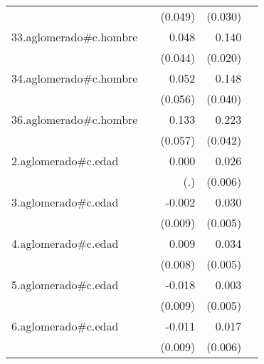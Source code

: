 {\begin{longtable}{l*{4}{D{.}{.}{-1}}}
            &                     &     (0.049)         &     (0.030)         &                     \\
\addlinespace
33.aglomerado#c.hombre&                     &       0.048         &       0.140\sym{***}&                     \\
            &                     &     (0.044)         &     (0.020)         &                     \\
\addlinespace
34.aglomerado#c.hombre&                     &       0.052         &       0.148\sym{***}&                     \\
            &                     &     (0.056)         &     (0.040)         &                     \\
\addlinespace
36.aglomerado#c.hombre&                     &       0.133\sym{*}  &       0.223\sym{***}&                     \\
            &                     &     (0.057)         &     (0.042)         &                     \\
\addlinespace
2.aglomerado#c.edad&                     &       0.000         &       0.026\sym{***}&                     \\
            &                     &         (.)         &     (0.006)         &                     \\
\addlinespace
3.aglomerado#c.edad&                     &      -0.002         &       0.030\sym{***}&                     \\
            &                     &     (0.009)         &     (0.005)         &                     \\
\addlinespace
4.aglomerado#c.edad&                     &       0.009         &       0.034\sym{***}&                     \\
            &                     &     (0.008)         &     (0.005)         &                     \\
\addlinespace
5.aglomerado#c.edad&                     &      -0.018         &       0.003         &                     \\
            &                     &     (0.009)         &     (0.005)         &                     \\
\addlinespace
6.aglomerado#c.edad&                     &      -0.011         &       0.017\sym{**} &                     \\
            &                     &     (0.009)         &     (0.006)         &                     \\

\end{longtable}}
